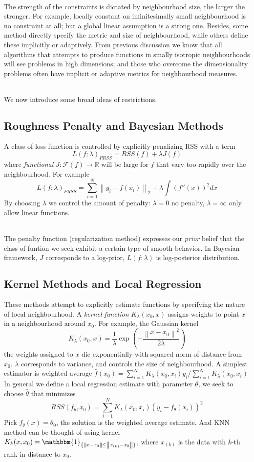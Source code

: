 \documentclass[a4paper, 11pt]{article}
\begin{document}
~\\
The strength of the constraints is dictated by neighbourhood size, the larger the stronger. For example, locally constant on infinitesimally small neighbourhood is no constraint at all; but a global linear assumption is a strong one. Besides, some method directly specify the metric and size of neighbourhood, while others define these implicitly or adaptively. From previous discussion we know that all algorithms that attempts to produce functions in smally isotropic neighbourhoods will see problems in high dimensions; and those who overcome the dimensionality problems often have implicit or adaptive metrics for neighbourhood measures.

~\\
We now introduce some broad ideas of restrictions.
\subsection{Roughness Penalty and Bayesian Methods} 
A class of loss function is controlled by explicitly penalizing RSS with a term
$$
L(f;\lambda)_{PRSS} = RSS(f) + \lambda J(f)
$$
where \emph{functional} $J: \mathcal{F}(f)\to \mathbb{R}$ will be large for $f$ that vary too rapidly over the neighbourhood. For example
$$
L(f; \lambda)_{PRSS} = \sum_{i=1}^N \left\|y_i - f(x_i)\right\|_2 + \lambda \int (f''(x))^2 dx
$$
By choosing $\lambda$ we control the amount of penalty: $\lambda=0$ no penalty, $\lambda=\infty$ only allow linear functions.

~\\
The penalty function (regularization method) expresses our \emph{prior} belief that the class of funtion we seek exhibit a certain type of smooth behavior. In Bayesian framework, $J$ corresponds to a log-prior, $L(f;\lambda)$ is log-posterior distribution. 

\subsection{Kernel Methods and Local Regression}
These methods attempt to explicitly estimate functions by specifying the nature of local neighbourhood. A \emph{kernel function} $K_{\lambda}(x_0, x)$ assigns weights to point $x$ in a neighbourhood around $x_0$. For example, the Gaussian kernel
$$
K_{\lambda}(x_0, x) = \frac{1}{\lambda} \exp\left(-\frac{\left\|x-x_0\right\|^2}{2 \lambda}\right)
$$ 
the weights assigned to $x$ die exponentially with squared norm of distance from $x_0$. $\lambda$ corresponds to variance, and controls the size of neighbourhood. A simplest estimator is weighted average $\hat{f}(x_0) = \sum_{i=1}^N K_{\lambda}(x_0,x_i)y_i/\sum_{i=1}^N K_{\lambda}(x_0, x_i)$
In general we define a local regression estimate with parameter $\theta$, we seek to choose $\hat{\theta}$ that minimizes
$$
RSS(f_{\theta}, x_0) = \sum_{i=1}^N K_{\lambda}(x_0, x_i) (y_i - f_{\theta}(x_i))^2
$$
Pick $f_{\theta}(x)=\theta_0$, the solution is the weighted average estimate. And KNN method can be thought of using kernel $K_k(x,x_0) = \mathbbm{1}_{\{\left\|x-x_0\right\|\leq \left\|x_{(k)}-x_0\right\|\}}$, where $x_{(k)}$ is the data with $k$-th rank in distance to $x_0$.
\end{document}
